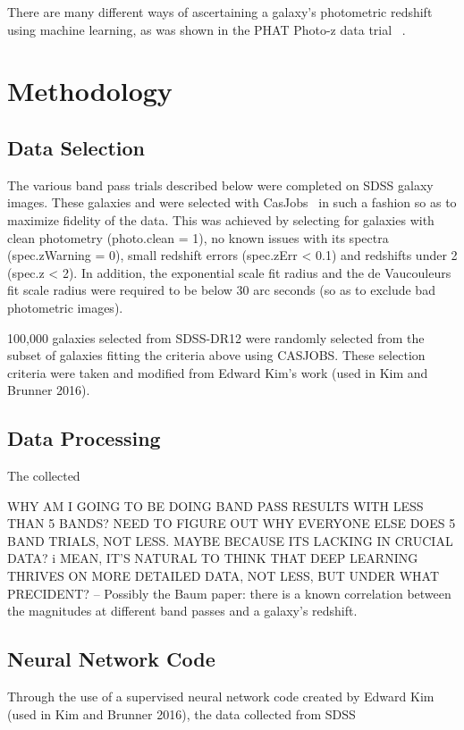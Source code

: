 \documentclass[fleqn,usenatbib]{mnras}
\begin{document}
There are many different ways of ascertaining a galaxy's photometric redshift using machine learning, as was shown in the PHAT Photo-z data trial ~\citep{hildebrandt_phat}.
  
\section{Methodology}
  \label{sec:method}

\subsection{Data Selection}
   \label{sec:data_sel}   
The various band pass trials described below were completed on SDSS galaxy images.  These galaxies and were selected with CasJobs~\citep{li_casjobs_2008} in such a fashion so as to maximize fidelity of the data.  This was achieved by selecting for galaxies with clean photometry (photo.clean = 1), no known issues with its spectra (spec.zWarning = 0), small redshift errors (spec.zErr < 0.1) and redshifts under 2 (spec.z < 2).  In addition, the exponential scale fit radius and the de Vaucouleurs fit scale radius were required to be below 30 arc seconds (so as to exclude bad photometric images).

100,000 galaxies selected from SDSS-DR12 were randomly selected from the subset of galaxies fitting the criteria above using CASJOBS.  These selection criteria were taken and modified from Edward Kim's work (used in Kim and Brunner 2016).

\subsection{Data Processing}
  \label{sec:data_proc}
The collected 


WHY AM I GOING TO BE DOING BAND PASS RESULTS WITH LESS THAN 5 BANDS? NEED TO FIGURE OUT WHY EVERYONE ELSE DOES 5 BAND TRIALS, NOT LESS.  MAYBE BECAUSE ITS LACKING IN CRUCIAL DATA? i MEAN, IT'S NATURAL TO THINK THAT DEEP LEARNING THRIVES ON MORE DETAILED DATA, NOT LESS, BUT UNDER WHAT PRECIDENT? -- Possibly the Baum paper: there is a known correlation between the magnitudes at different band passes and a galaxy's redshift.


\subsection{Neural Network Code}
  \label{sec:code}
Through the use of a supervised neural network code created by Edward Kim (used in Kim and Brunner 2016), the data collected from SDSS
\end{document}
